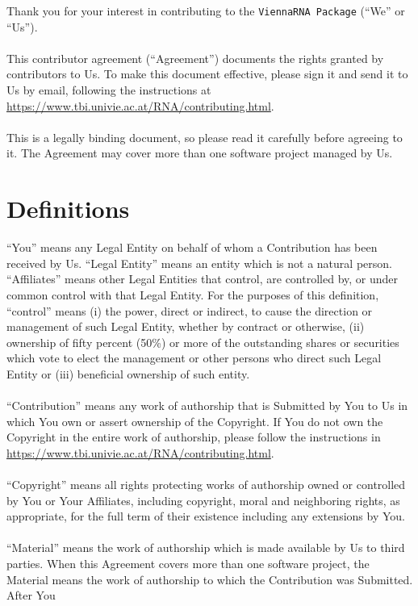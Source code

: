 \documentclass{article}
\begin{document}
\noindent
Thank you for your interest in contributing to the \texttt{ViennaRNA Package}
(``We'' or ``Us'').
\\\\
\noindent
This contributor agreement (``Agreement'') documents the rights granted by
contributors to Us. To make this document effective, please sign it and send it
to Us by email, following the instructions at
\url{https://www.tbi.univie.ac.at/RNA/contributing.html}.\\\\
This is a legally binding document, so please read it carefully before agreeing
to it. The Agreement may cover more than one software project managed by Us.


\section{Definitions}
\noindent
``You'' means any Legal Entity on behalf of whom a Contribution has been received
by Us. ``Legal Entity'' means an entity which is not a natural person.
``Affiliates'' means other Legal Entities that control, are controlled by, or
under common control with that Legal Entity. For the purposes of this
definition, ``control'' means (i) the power, direct or indirect, to cause the
direction or management of such Legal Entity, whether by contract or otherwise,
(ii) ownership of fifty percent (50\%) or more of the outstanding shares or
securities which vote to elect the management or other persons who direct such
Legal Entity or (iii) beneficial ownership of such entity.
\\
\\
\noindent
``Contribution'' means any work of authorship that is Submitted by You to Us in
which You own or assert ownership of the Copyright. If You do not own the
Copyright in the entire work of authorship, please follow the instructions in
\url{https://www.tbi.univie.ac.at/RNA/contributing.html}.
\\
\\
\noindent
``Copyright'' means all rights protecting works of authorship owned or
controlled by You or Your Affiliates, including copyright, moral and neighboring
rights, as appropriate, for the full term of their existence including any
extensions by You.
\\
\\
\noindent
``Material'' means the work of authorship which is made available by Us to third
parties. When this Agreement covers more than one software project, the Material
means the work of authorship to which the Contribution was Submitted. After You
\end{document}
